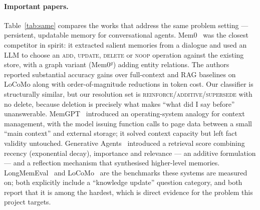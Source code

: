 \documentclass[11pt,a4paper]{article}
\begin{document}
\paragraph{Important papers.} Table~\ref{tab:same} compares the works that
address the same problem setting --- persistent, updatable memory for
conversational agents. Mem0~\cite{chhikara2025mem0} was the closest competitor
in spirit: it extracted salient memories from a dialogue and used an LLM to
choose an \textsc{add}, \textsc{update}, \textsc{delete} or \textsc{noop}
operation against the existing store, with a graph variant (Mem0$^g$) adding
entity relations. The authors reported substantial accuracy gains over
full-context and RAG baselines on LoCoMo along with order-of-magnitude
reductions in token cost. Our classifier is structurally similar, but our
resolution set is \textsc{reinforce}/\textsc{additive}/\textsc{supersede} with
no delete, because deletion is precisely what makes ``what did I say before''
unanswerable. MemGPT~\cite{packer2023memgpt} introduced an operating-system
analogy for context management, with the model issuing function calls to page
data between a small ``main context'' and external storage; it solved context
capacity but left fact validity untouched. Generative
Agents~\cite{park2023generativeagents} introduced a retrieval score combining
recency (exponential decay), importance and relevance --- an additive
formulation --- and a reflection mechanism that synthesised higher-level
memories. LongMemEval~\cite{wu2024longmemeval} and
LoCoMo~\cite{maharana2024locomo} are the benchmarks these systems are measured
on; both explicitly include a ``knowledge update'' question category, and both
report that it is among the hardest, which is direct evidence for the problem
this project targets.
\end{document}
